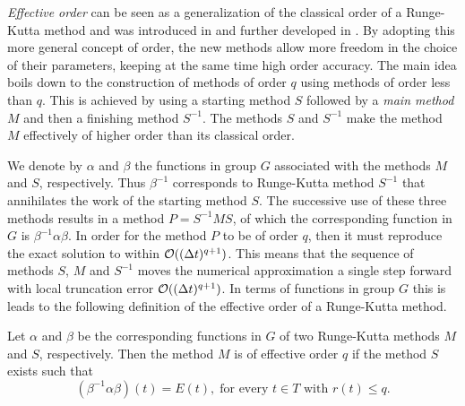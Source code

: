 \emph{Effective order} can be seen as a generalization of the classical order of a Runge-Kutta method and was introduced in \cite{Butcher1969} and further developed in \cite{Butcher1998, Butcher1996}.
By adopting this more general concept of order, the new methods allow more freedom in the choice of their parameters, keeping at the same time high order accuracy. The main idea boils down to the construction of methods of order $q$
using methods of order less than $q$. This is achieved by using a starting method $S$ followed by a \emph{main method} $M$ %
and then a finishing method $S^{-1}$.
The methods $S$ and $S^{-1}$ make the method $M$ effectively of higher order than its classical order.

We denote by $\alpha$ and $\beta$ the functions in group $G$ associated with the methods $M$ and $S$, respectively.  Thus $\beta^{-1}$ corresponds to Runge-Kutta method $S^{-1}$ that annihilates the work of the starting method $S$. The successive use of these three methods results in a method $P = S^{-1}MS$, of which the corresponding function in $G$ is $\beta^{-1}\alpha\beta$. In order for the method $P$ to be of order $q$, then it must reproduce the exact solution to within $\mathcal{O}((\Delta t)^{q+1})$. This means that the sequence of methods \( S \), \( M \) and \( S^{-1} \) moves the numerical approximation a single step forward with local truncation error \( \mathcal{O}((\Delta t)^{q+1}) \). In terms of functions in group $G$ this is leads to the following definition of the effective order of a Runge-Kutta method.
\begin{definition}\cite{Butcher1987_book}\label{def:Effective_order}
	Let $\alpha$ and $\beta$ be the corresponding functions in $G$ of two Runge-Kutta methods $M$ and $S$, respectively. Then the method $M$ is of effective order $q$ if the method $S$ exists such that
	\begin{equation}\label{eq:Effective_order_1}
		(\beta^{-1}\alpha\beta)(t) = E(t), \; \text{for every } t \in T \text{ with } r(t) \leq q.
	\end{equation}
\end{definition}

